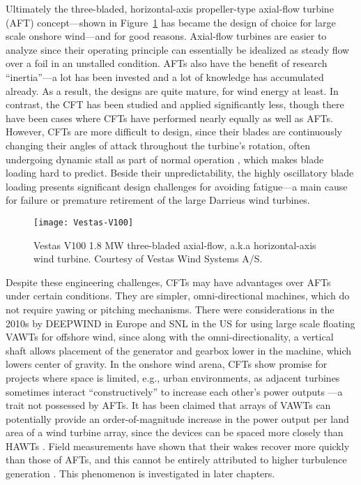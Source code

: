 Ultimately the three-bladed, horizontal-axis propeller-type axial-flow turbine
(AFT) concept---shown in Figure~\ref{fig:AFT} has became the design of choice
for large scale onshore wind---and for good reasons. Axial-flow turbines are
easier to analyze since their operating principle can essentially be idealized
as steady flow over a foil in an unstalled condition. AFTs also have the benefit
of research ``inertia''---a lot has been invested and a lot of knowledge has
accumulated already. As a result, the designs are quite mature, for wind energy
at least. In contrast, the CFT has been studied and applied significantly less,
though there have been cases where CFTs have performed nearly equally as well as
AFTs. However, CFTs are more difficult to design, since their blades are
continuously changing their angles of attack throughout the turbine's rotation,
often undergoing dynamic stall as part of normal operation \cite{Para2002},
which makes blade loading hard to predict. Beside their unpredictability, the
highly oscillatory blade loading presents significant design challenges for
avoiding fatigue---a main cause for failure or premature retirement of the large
Darrieus wind turbines.

\begin{figure}
    \centering
    
    \texttt{[image: Vestas-V100]}
    
    \caption{Vestas V100 1.8 MW three-bladed axial-flow, a.k.a horizontal-axis
        wind turbine. Courtesy of Vestas Wind Systems A/S.}
    
    \label{fig:AFT}
\end{figure}

Despite these engineering challenges, CFTs may have advantages over AFTs under
certain conditions. They are simpler, omni-directional machines, which do not
require yawing or pitching mechanisms. There were considerations in the 2010s by
DEEPWIND in Europe \cite{Paulsen2011} and SNL \cite{Sandia2012} in the US for
using large scale floating VAWTs for offshore wind, since along with the
omni-directionality, a vertical shaft allows placement of the generator and
gearbox lower in the machine, which lowers center of gravity. In the onshore
wind arena, CFTs show promise for projects where space is limited, e.g., urban
environments, as adjacent turbines sometimes interact ``constructively'' to
increase each other's power outputs \cite{Li2010}---a trait not possessed by
AFTs. It has been claimed that arrays of VAWTs can potentially provide an
order-of-magnitude increase in the power output per land area of a wind turbine
array, since the devices can be spaced more closely than HAWTs
\cite{Dabiri2011}. Field measurements have shown that their wakes recover more
quickly than those of AFTs, and this cannot be entirely attributed to higher
turbulence generation \cite{Kinzel2012}. This phenomenon is investigated in
later chapters.

